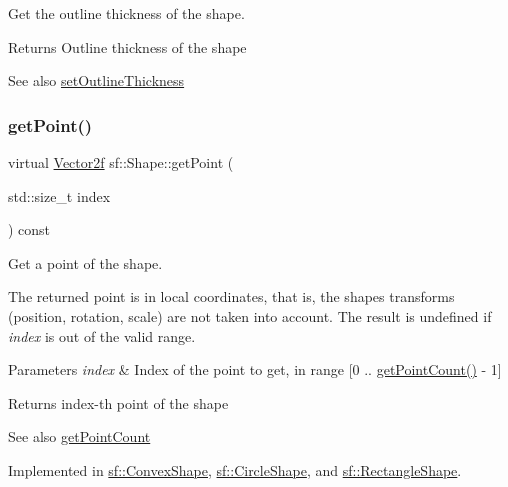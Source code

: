 Get the outline thickness of the shape. 

\begin{DoxyReturn}{Returns}
Outline thickness of the shape
\end{DoxyReturn}
\begin{DoxySeeAlso}{See also}
\hyperlink{classsf_1_1_shape_a5ad336ad74fc1f567fce3b7e44cf87dc}{set\+Outline\+Thickness} 
\end{DoxySeeAlso}
\mbox{\label{classsf_1_1_shape_a40e5d83713eb9f0c999944cf96458085}} 
\subsubsection{\texorpdfstring{get\+Point()}{getPoint()}}
{\footnotesize\ttfamily virtual \hyperlink{classsf_1_1_vector2}{Vector2f} sf\+::\+Shape\+::get\+Point (\begin{DoxyParamCaption}\item[{std\+::size\+\_\+t}]{index }\end{DoxyParamCaption}) const\hspace{0.3cm}{\ttfamily [pure virtual]}}



Get a point of the shape. 

The returned point is in local coordinates, that is, the shape\textquotesingle{}s transforms (position, rotation, scale) are not taken into account. The result is undefined if {\itshape index} is out of the valid range.


\begin{DoxyParams}{Parameters}
{\em index} & Index of the point to get, in range \mbox{[}0 .. \hyperlink{classsf_1_1_shape_af988dd61a29803fc04d02198e44b5643}{get\+Point\+Count()} -\/ 1\mbox{]}\\
\hline
\end{DoxyParams}
\begin{DoxyReturn}{Returns}
index-\/th point of the shape
\end{DoxyReturn}
\begin{DoxySeeAlso}{See also}
\hyperlink{classsf_1_1_shape_af988dd61a29803fc04d02198e44b5643}{get\+Point\+Count} 
\end{DoxySeeAlso}


Implemented in \hyperlink{classsf_1_1_convex_shape_a72a97bc426d8daf4d682a20fcb7f3fe7}{sf\+::\+Convex\+Shape}, \hyperlink{classsf_1_1_circle_shape_a2d7f9715502b960b92387102fddb8736}{sf\+::\+Circle\+Shape}, and \hyperlink{classsf_1_1_rectangle_shape_a3909f1a1946930ff5ae17c26206c0f81}{sf\+::\+Rectangle\+Shape}.

